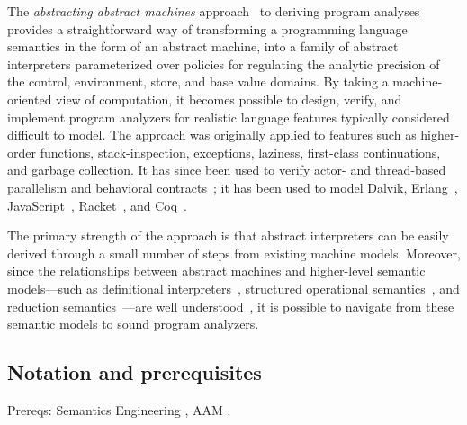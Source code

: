\documentclass[preprint,onecolumn,9pt]{sigplanconf} %
\begin{document}
The \emph{abstracting abstract machines}
approach~\cite{dvanhorn:VanHorn2011Abstracting,dvanhorn:VanHorn2012Systematic}
to deriving program analyses provides a straightforward way of
transforming a programming language semantics in the form of an
abstract machine, into a family of abstract interpreters parameterized
over policies for regulating the analytic precision of the control,
environment, store, and base value domains.  By taking a
machine-oriented view of computation, it becomes possible to design,
verify, and implement program analyzers for realistic language
features typically considered difficult to model.  The approach was
originally applied to features such as higher-order functions,
stack-inspection, exceptions, laziness, first-class continuations, and
garbage collection.  It has since been used to verify actor-
\cite{local:DOsualdo:12A} and
thread-based~\cite{dvanhorn:Might2011Family} parallelism and
behavioral contracts~\cite{dvanhorn:TobinHochstadt2012Higherorder}; it
has been used to model Dalvik, Erlang~\cite{local:DOsualdo:12B},
JavaScript~\cite{local:DBLP:journals/corr/abs-1109-4467},
Racket~\cite{dvanhorn:TobinHochstadt2012Higherorder}, and
Coq~\cite{local:harvard}.

The primary strength of the approach is that abstract interpreters can
be easily derived through a small number of steps from existing
machine models. %
Moreover, since the relationships between abstract machines and
higher-level semantic models---such as definitional
interpreters~\cite{dvanhorn:reynolds-hosc98}, structured operational
semantics~\cite{dvanhorn:Plotkin1981Structural}, and reduction
semantics~\cite{dvanhorn:Felleisen2009Semantics}---are well
understood~\cite{dvanhorn:Danvy:DSc}, it is possible to navigate from
these semantic models to sound program analyzers.





\subsection{Notation and prerequisites}

Prereqs: Semantics Engineering \cite{dvanhorn:Felleisen2009Semantics},
AAM \cite{dvanhorn:VanHorn2011Abstracting}
\cite{dvanhorn:VanHorn2012Systematic}.
\end{document}
